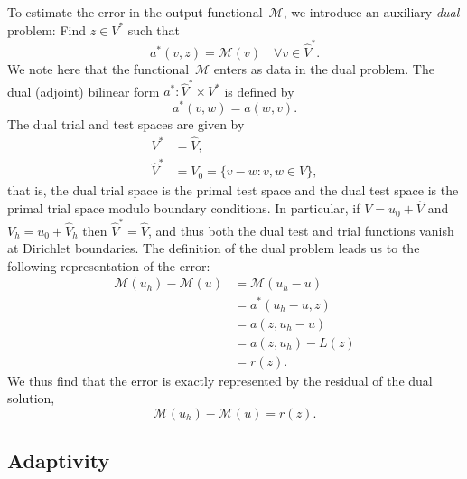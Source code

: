 To estimate the error in the output functional~$\mathcal{M}$, we
introduce an auxiliary \emph{dual} problem: Find $z \in V^*$ such that
\begin{equation} \label{eq:varproblem,dual}
  a^*(v, z) = \mathcal{M}(v) \quad \forall v \in \hat{V}^*.
\end{equation}
We note here that the functional~$\mathcal{M}$ enters as data in the
dual problem. The dual (adjoint) bilinear form $a^* : \hat{V}^* \times
V^*$ is defined by
\begin{displaymath}
  a^*(v, w) = a(w, v).
\end{displaymath}
The dual trial and test spaces are given by
\begin{displaymath}
  \begin{split}
    V^* &= \hat{V}, \\
    \hat{V}^* &= V_0 = \{v - w : v, w \in V\},
  \end{split}
\end{displaymath}
that is, the dual trial space is the primal test space and the dual
test space is the primal trial space modulo boundary conditions. In
particular, if $V = u_0 + \hat{V}$ and $V_h = u_0 + \hat{V}_h$ then
$\hat{V}^* = \hat{V}$, and thus both the dual test and trial functions
vanish at Dirichlet boundaries. The definition of the dual problem
leads us to the following representation of the error:
\begin{displaymath}
  \begin{split}
    \mathcal{M}(u_h) - \mathcal{M}(u)
    &= \mathcal{M}(u_h - u) \\
    &= a^*(u_h - u, z) \\
    &= a(z, u_h - u) \\
    &= a(z, u_h) - L(z) \\
    &= r(z).
  \end{split}
\end{displaymath}
We thus find that the error is exactly represented by the residual
of the dual solution,
\begin{equation} \label{eq:aposteriori,dual}
  \mathcal{M}(u_h) - \mathcal{M}(u) = r(z).
\end{equation}

\subsection{Adaptivity}

